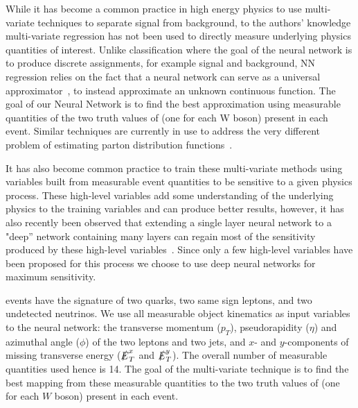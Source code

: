 While it has become a common practice in high energy physics to use
multi-variate techniques to separate signal from background, to the
authors' knowledge multi-variate regression has not been used to
directly measure underlying physics quantities of interest. Unlike
classification where the goal of the neural network is to
produce discrete assignments, for example signal and background, 
NN regression relies on the fact that a neural network can serve as a
universal approximator~\cite{NN_1}, to instead approximate an unknown continuous function.
The goal of our Neural Network is to find the best approximation using measurable quantities 
of the two truth values of \cts (one for each W boson) present in each event. Similar techniques
are currently in use to address the very different problem of estimating parton distribution functions~\cite{NNPDF}.

It has also become common practice to train these multi-variate methods using variables built
from measurable event quantities to be sensitive to a given physics process. These high-level
variables add some understanding of the underlying physics to the training variables and 
can produce better results, however, it has also recently been observed that extending a single layer neural network
to a "deep'' network containing many layers can regain most of the sensitivity produced
by these high-level variables~\cite{Baldi:2014kfa,Baldi:2014pta}. Since only a few
high-level variables have been proposed for this process we choose to use deep neural 
networks for maximum sensitivity. 

\ssWW events have the signature of two quarks, two same sign leptons, and
two undetected neutrinos.  We use all measurable object kinematics as input variables
to the neural network: the transverse momentum ($p_T$), pseudorapidity ($\eta$) and
azimuthal angle ($\phi$) of the two leptons and two jets, and $x$- and $y$-components 
of missing transverse energy ($\slashed{E}_T^x$ and
$\slashed{E}_T^y$).  The overall number of measurable quantities used hence is 14. 
The goal of the multi-variate technique is to find
the best mapping from these measurable quantities to the two truth
values of \cts (one for each $W$ boson) present in each event.

